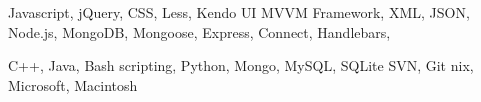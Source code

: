 
\citembullet Javascript, jQuery, CSS, Less, Kendo UI MVVM Framework, XML, JSON, 
\citembullet Node.js, MongoDB, Mongoose, Express, Connect, Handlebars, 

\citembullet C++, Java, Bash scripting, Python, 
\citembullet Mongo, MySQL, SQLite %
\citembullet SVN, Git
\citembullet *nix, Microsoft, Macintosh  %

